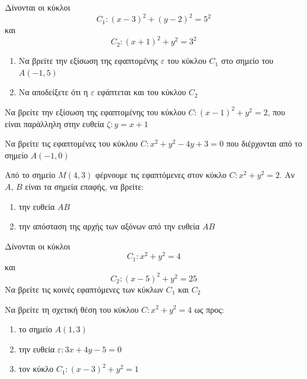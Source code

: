 \documentclass{presentation}
\begin{document}
\begin{askisi}
  Δίνονται οι κύκλοι
  $$C_1:(x-3)^2+(y-2)^2=5^2$$
  και
  $$C_2:(x+1)^2+y^2=3^2$$
  \begin{enumerate}
    \item<1-> Να βρείτε την εξίσωση της εφαπτομένης $ε$ του κύκλου $C_1$ στο σημείο του $Α(-1,5)$
    \item<2-> Να αποδείξετε ότι η $ε$ εφάπτεται και του κύκλου $C_2$
  \end{enumerate}

\end{askisi}

\begin{askisi}
  Να βρείτε την εξίσωση της εφαπτομένης του κύκλου $C:(x-1)^2+y^2=2$, που είναι παράλληλη στην ευθεία $ζ:y=x+1$

\end{askisi}

\begin{askisi}
  Να βρείτε τις εφαπτομένες του κύκλου $C:x^2+y^2-4y+3=0$ που διέρχονται από το σημείο $Α(-1,0)$

\end{askisi}

\begin{askisi}
  Από το σημείο $Μ(4,3)$ φέρνουμε τις εφαπτόμενες στον κύκλο $C:x^2+y^2=2$. Αν $Α$, $Β$ είναι τα σημεία επαφής, να βρείτε:
  \begin{enumerate}
    \item<1-> την ευθεία $ΑΒ$
    \item<2-> την απόσταση της αρχής των αξόνων από την ευθεία $ΑΒ$
  \end{enumerate}

\end{askisi}

\begin{askisi}
  Δίνονται οι κύκλοι
  $$C_1:x^2+y^2=4$$
  και
  $$C_2:(x-5)^2+y^2=25$$
  Να βρείτε τις κοινές εφαπτόμενες των κύκλων $C_1$ και $C_2$

\end{askisi}

\begin{askisi}
  Να βρείτε τη σχετική θέση του κύκλου $C:x^2+y^2=4$ ως προς:
  \begin{enumerate}
    \item<1-> το σημείο $Α(1,3)$
    \item<2-> την ευθεία $ε:3x+4y-5=0$
    \item<3-> τον κύκλο $C_1:(x-3)^2+y^2=1$
  \end{enumerate}

\end{askisi}
\end{document}
